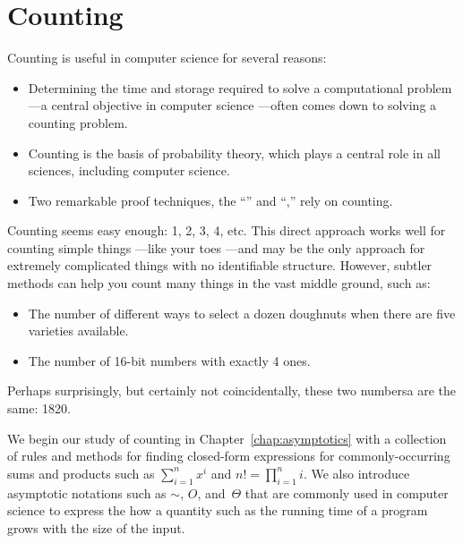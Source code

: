 \part{Counting}
\label{part:counting}

\partintro
{}


Counting is useful in computer science for several reasons:
\begin{itemize}

\item

Determining the time and storage required to solve a computational
problem ---a central objective in computer science ---often comes down
to solving a counting problem.

\item

Counting is the basis of probability theory, which plays a central
role in all sciences, including computer science.

\item

Two remarkable proof techniques, the ``''
and ``,'' rely on counting.
\iffalse
These lead to a variety of interesting and useful insights.
\fi

\end{itemize}

Counting seems easy enough: 1, 2, 3, 4, etc.  This direct approach
works well for counting simple things ---like your toes ---and may be
the only approach for extremely complicated things with no
identifiable structure.  However, subtler methods can help you count
many things in the vast middle ground, such as:
\begin{itemize}

\item The number of different ways to select a dozen doughnuts when
there are five varieties available.

\item The number of 16-bit numbers with exactly 4 ones.

\end{itemize}
Perhaps surprisingly, but certainly not coincidentally, these two
numbersa are the same: 1820.

We begin our study of counting in Chapter~\ref{chap:asymptotics} with
a collection of rules and methods for finding closed-form expressions
for commonly-occurring sums and products such as $\sum_{i = 1}^n x^i$
and $n! = \prod_{i=1}^n i$.  We also introduce asymptotic notations
such as $\sim$, $O$, and~$\Theta$ that are commonly used in computer
science to express the how a quantity such as the running time of a
program grows with the size of the input.

